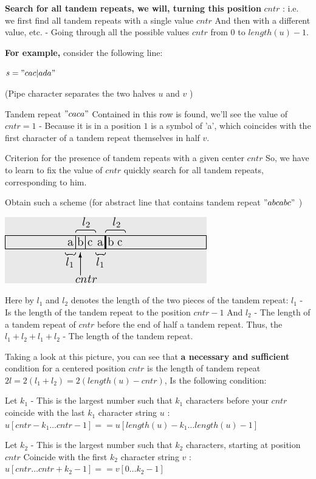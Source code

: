 \textbf{Search for all tandem repeats, we will, turning this position} \textbf{$cntr$} : i.e. we first find all tandem repeats with a single value $cntr$ And then with a different value, etc. - Going through all the possible values $cntr$ from $0$ to $length (u) -1$.

\textbf{For example,} consider the following line:

$s =" cac|ada" $

(Pipe character separates the two halves $u$ and $v$ )

Tandem repeat $" caca"$ Contained in this row is found, we'll see the value of $cntr = 1$ - Because it is in a position $1$ is a symbol of 'a', which coincides with the first character of a tandem repeat themselves in half $v$.

Criterion for the presence of tandem repeats with a given center $cntr$
So, we have to learn to fix the value of $cntr$ quickly search for all tandem repeats, corresponding to him.

Obtain such a scheme (for abstract line that contains tandem repeat $" abcabc"$ )

\includegraphics[scale=0.5]{11.png}

Here by $l_1$ and $l_2$ denotes the length of the two pieces of the tandem repeat: $l_1$ - Is the length of the tandem repeat to the position $cntr-1$ And $l_2$ - The length of a tandem repeat of $cntr$ before the end of half a tandem repeat. Thus, the $l_1 + l_2 + l_1 + l_2$ - The length of the tandem repeat.

Taking a look at this picture, you can see that \textbf{a necessary and sufficient} condition for a centered position $cntr$ is the length of tandem repeat $2 l = 2 (l_1 + l_2) = 2 (length (u) - cntr)$, Is the following condition:

Let $k_1$ - This is the largest number such that $k_1$ characters before your $cntr$ coincide with the last $k_1$ character string $u$ :
$u[cntr-k_{1}\ldots cntr-1]==u[length(u)-k_{1}\ldots length(u)-1]$

Let $k_2$ - This is the largest number such that $k_2$ characters, starting at position $cntr$ Coincide with the first $k_2$ character string $v$ :
$u[cntr\ldots cntr+k_{2}-1]==v[0\ldots k_{2}-1]$

